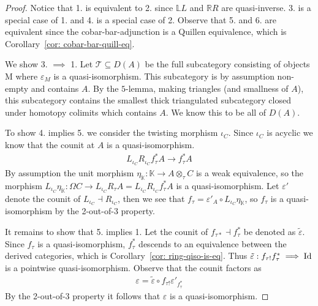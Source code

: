 \documentclass[../thesis.tex]{subfiles}
\begin{document}
            \begin{proof}
                Notice that 1. is equivalent to 2. since $\mathbb{L}L$ and $\mathbb{R}R$ are quasi-inverse. 3. is a special case of 1. and 4. is a special case of 2. Observe that 5. and 6. are equivalent since the cobar-bar-adjunction is a Quillen equivalence, which is Corollary~\ref{cor: cobar-bar-quill-eq}.

                We show 3. $\implies$ 1. Let $\mathcal{T}\subseteq D(A)$ be the full subcategory consisting of objects M where $\varepsilon_M$ is a quasi-isomorphism. This subcategory is by assumption non-empty and contains $A$. By the $5$-lemma, making triangles (and smallness of $A$), this subcategory contains the smallest thick triangulated subcategory closed under homotopy colimits which contains $A$. We know this to be all of $D(A)$.

                To show 4. implies 5. we consider the twisting morphism $\iota_C$. Since $\iota_C$ is acyclic we know that the counit at $A$ is a quasi-isomorphism. 
                \begin{align*}
                    L_{\iota_C}R_{\iota_C}f_{\tau}^*A \rightarrow f_\tau^*A
                \end{align*}
                By assumption the unit morphism $\eta_\mathbb{K} : \mathbb{K} \rightarrow A \otimes_\tau C$ is a weak equivalence, so the morphism $L_{\iota_C}\eta_\mathbb{K} : \Omega C \rightarrow L_{\iota_C}R_\tau A = L_{\iota_C}R_{\iota_C}f_\tau^* A$ is a quasi-isomorphism. Let $\varepsilon'$ denote the counit of $L_{\iota_C} \dashv R_{\iota_C}$, then we see that $f_\tau = \varepsilon'_A \circ L_{\iota_C}\eta_\mathbb{K}$, so $f_\tau$ is a quasi-isomorphism by the 2-out-of-3 property.

                It remains to show that 5. implies 1. Let the counit of $f_{\tau *} \dashv f_\tau^*$ be denoted as $\tilde{\varepsilon}$. Since $f_\tau$ is a quasi-isomorphism, $f_\tau^*$ descends to an equivalence between the derived categories, which is Corollary~\ref{cor: ring-qiso-is-eq}. Thus $\tilde{\varepsilon} : f_{\tau !}f_\tau^* \implies \tt{Id}$ is a pointwise quasi-isomorphism. Observe that the counit factors as
                \begin{align*}
                    \varepsilon = \tilde{\varepsilon} \circ f_{\tau !}\varepsilon'_{f_\tau^*}
                \end{align*}
                By the 2-out-of-3 property it follows that $\varepsilon$ is a quasi-isomorphism.
            \end{proof}
\end{document}
